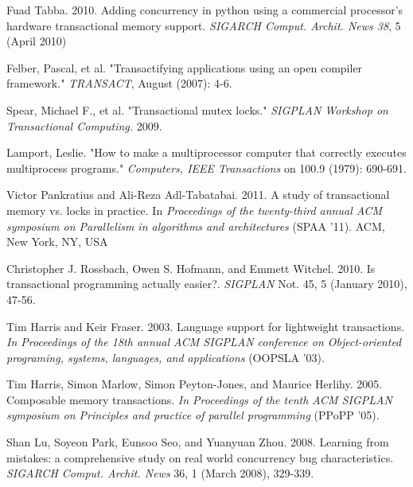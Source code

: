 \documentclass{sigplanconf}
\begin{document}
\begin{thebibliography}{}
  Fuad Tabba. 2010. Adding concurrency in python using a commercial
  processor's hardware transactional memory support. \emph{SIGARCH
  Comput. Archit. News 38}, 5 (April 2010)

  Felber, Pascal, et al. "Transactifying applications using an open
  compiler framework." \emph{TRANSACT}, August (2007): 4-6.


  Spear, Michael F., et al. "Transactional mutex locks." \emph{SIGPLAN
    Workshop on Transactional Computing.} 2009.

  Lamport, Leslie. "How to make a multiprocessor computer that
  correctly executes multiprocess programs." \emph{Computers, IEEE
    Transactions} on 100.9 (1979): 690-691.

  Victor Pankratius and Ali-Reza Adl-Tabatabai. 2011. A study of
  transactional memory vs. locks in practice. In \emph{Proceedings of
    the twenty-third annual ACM symposium on Parallelism in algorithms
    and architectures} (SPAA '11). ACM, New York, NY, USA

  Christopher J. Rossbach, Owen S. Hofmann, and Emmett
  Witchel. 2010. Is transactional programming actually
  easier?. \emph{SIGPLAN} Not. 45, 5 (January 2010), 47-56.

  Tim Harris and Keir Fraser. 2003. Language support for lightweight
  transactions. \emph{In Proceedings of the 18th annual ACM SIGPLAN
    conference on Object-oriented programing, systems, languages, and
    applications} (OOPSLA '03).

  Tim Harris, Simon Marlow, Simon Peyton-Jones, and Maurice
  Herlihy. 2005. Composable memory transactions. \emph{In Proceedings
    of the tenth ACM SIGPLAN symposium on Principles and practice of
    parallel programming} (PPoPP '05).

  Shan Lu, Soyeon Park, Eunsoo Seo, and Yuanyuan Zhou. 2008. Learning
  from mistakes: a comprehensive study on real world concurrency bug
  characteristics. \emph{SIGARCH Comput. Archit. News} 36, 1 (March 2008),
  329-339.



\end{thebibliography}
\end{document}
